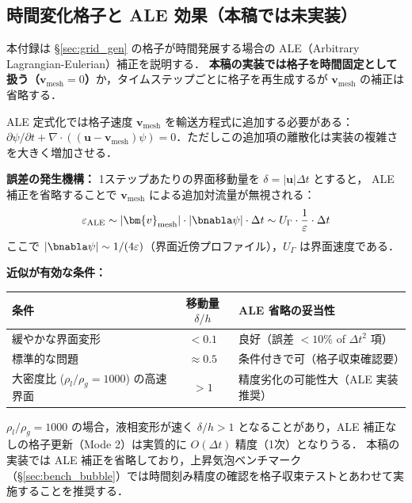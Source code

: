 \subsection{時間変化格子と ALE 効果（本稿では未実装）}
\label{app:grid_ale}

本付録は §\ref{sec:grid_gen} の格子が時間発展する場合の ALE（Arbitrary Lagrangian-Eulerian）補正を説明する．
\textbf{本稿の実装では格子を時間固定として扱う（$\bm{v}_\text{mesh} = 0$）}か，タイムステップごとに格子を再生成するが $\bm{v}_\text{mesh}$ の補正は省略する．

ALE 定式化では格子速度 $\bm{v}_\text{mesh}$ を輸送方程式に追加する必要がある：$\partial\psi/\partial t + \nabla\cdot((\bm{u} - \bm{v}_\text{mesh})\psi) = 0$．ただしこの追加項の離散化は実装の複雑さを大きく増加させる．

\textbf{誤差の発生機構：}
1ステップあたりの界面移動量を $\delta = |\bm{u}|\Delta t$ とすると，
ALE 補正を省略することで $\bm{v}_\text{mesh}$ による追加対流量が無視される：
\[
  \varepsilon_{\text{ALE}} \sim |\bm{v}_\text{mesh}| \cdot |\bnabla\psi| \cdot \Delta t \sim U_\Gamma \cdot \frac{1}{\varepsilon} \cdot \Delta t
\]
ここで $|\bnabla\psi| \sim 1/(4\varepsilon)$（界面近傍プロファイル），$U_\Gamma$ は界面速度である．

\textbf{近似が有効な条件：}
\begin{center}
\renewcommand{\arraystretch}{1.3}
\begin{tabular}{>{\raggedright\arraybackslash}p{48mm}c>{\raggedright\arraybackslash}p{42mm}}
\hline
条件 & 移動量 $\delta/h$ & ALE 省略の妥当性 \\
\hline
緩やかな界面変形 & $< 0.1$ & 良好（誤差 $< 10\%$ of $\Delta t^2$ 項） \\
標準的な問題 & $\approx 0.5$ & 条件付きで可（格子収束確認要） \\
大密度比 ($\rho_l/\rho_g{=}1000$) の高速界面 & $> 1$ & 精度劣化の可能性大（ALE 実装推奨） \\
\hline
\end{tabular}
\end{center}

$\rho_l/\rho_g = 1000$ の場合，液相変形が速く $\delta/h > 1$ となることがあり，ALE 補正なしの格子更新（Mode 2）は実質的に $O(\Delta t)$ 精度（1次）となりうる．
本稿の実装では ALE 補正を省略しており，上昇気泡ベンチマーク（§\ref{sec:bench_bubble}）では時間刻み精度の確認を格子収束テストとあわせて実施することを推奨する．

